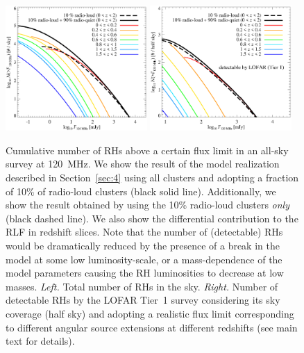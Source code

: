 \documentclass[useAMS,usenatbib]{mn2e}
\begin{document}
\begin{figure} 
\centering
\includegraphics[width=0.48\textwidth]{figures/RLF_LOFAR_flux.eps}
\includegraphics[width=0.48\textwidth]{figures/RLF_LOFAR_flux_detectable.eps}
\caption{Cumulative number of RHs above a certain flux limit in an all-sky
  survey at 120~MHz. We show the result of the model realization described in
  Section~\ref{sec:4} using all clusters and adopting a fraction of 10\% of
  radio-loud clusters (black solid line). Additionally, we show the result
  obtained by using the 10\% radio-loud clusters \emph{only} (black dashed
  line). We also show the differential contribution to the RLF in redshift
  slices. Note that the number of (detectable) RHs would be dramatically reduced
  by the presence of a break in the model at some low luminosity-scale, or a
  mass-dependence of the model parameters causing the RH luminosities to
  decrease at low masses.  \emph{Left.} Total number of RHs in the sky.
  \emph{Right.} Number of detectable RHs by the LOFAR Tier~1 survey considering
  its sky coverage (half sky) and adopting a realistic flux limit corresponding
  to different angular source extensions at different redshifts (see main text for details).
}
\label{fig:RLF_120_flux}
\end{figure}
\end{document}
